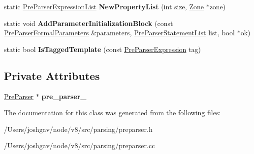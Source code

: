 \begin{DoxyCompactItemize}
\item 
static \hyperlink{classv8_1_1internal_1_1_pre_parser_list}{Pre\+Parser\+Expression\+List} {\bfseries New\+Property\+List} (int size, \hyperlink{classv8_1_1internal_1_1_zone}{Zone} $\ast$zone)\hypertarget{classv8_1_1internal_1_1_pre_parser_traits_a5859ff70c0c65c0754c997411fdce261}{}\label{classv8_1_1internal_1_1_pre_parser_traits_a5859ff70c0c65c0754c997411fdce261}

\item 
static void {\bfseries Add\+Parameter\+Initialization\+Block} (const \hyperlink{structv8_1_1internal_1_1_pre_parser_formal_parameters}{Pre\+Parser\+Formal\+Parameters} \&parameters, \hyperlink{classv8_1_1internal_1_1_pre_parser_list}{Pre\+Parser\+Statement\+List} list, bool $\ast$ok)\hypertarget{classv8_1_1internal_1_1_pre_parser_traits_aade15435c5f144d3199285f37faa13ab}{}\label{classv8_1_1internal_1_1_pre_parser_traits_aade15435c5f144d3199285f37faa13ab}

\item 
static bool {\bfseries Is\+Tagged\+Template} (const \hyperlink{classv8_1_1internal_1_1_pre_parser_expression}{Pre\+Parser\+Expression} tag)\hypertarget{classv8_1_1internal_1_1_pre_parser_traits_aeea219261f3b2b3449498a7c88ccacdf}{}\label{classv8_1_1internal_1_1_pre_parser_traits_aeea219261f3b2b3449498a7c88ccacdf}

\end{DoxyCompactItemize}
\subsection*{Private Attributes}
\begin{DoxyCompactItemize}
\item 
\hyperlink{classv8_1_1internal_1_1_pre_parser}{Pre\+Parser} $\ast$ {\bfseries pre\+\_\+parser\+\_\+}\hypertarget{classv8_1_1internal_1_1_pre_parser_traits_a4fe184f2beeba789ad26af5d083e0b76}{}\label{classv8_1_1internal_1_1_pre_parser_traits_a4fe184f2beeba789ad26af5d083e0b76}

\end{DoxyCompactItemize}


The documentation for this class was generated from the following files\+:\begin{DoxyCompactItemize}
\item 
/\+Users/joshgav/node/v8/src/parsing/preparser.\+h\item 
/\+Users/joshgav/node/v8/src/parsing/preparser.\+cc\end{DoxyCompactItemize}
